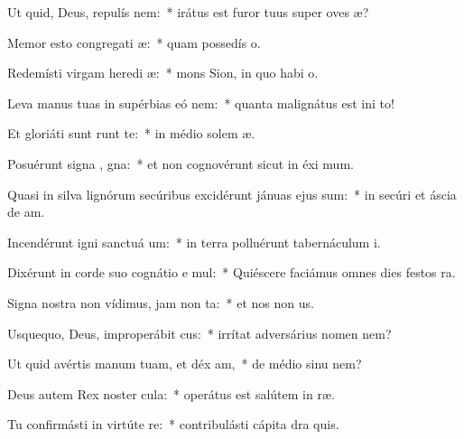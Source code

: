 \item Ut quid, Deus, repulís  nem:~* irátus est furor tuus super oves  æ?
\item Memor esto congregati æ:~* quam possedís  o.
\item Redemísti virgam heredi æ:~* mons Sion, in quo habi  o.
\item Leva manus tuas in supérbias eó  nem:~* quanta malignátus est ini  to!
\item Et gloriáti sunt  runt te:~* in médio solem æ.
\item Posuérunt signa , gna:~* et non cognovérunt sicut in éxi  mum.
\item Quasi in silva lignórum secúribus excidérunt jánuas ejus  sum:~* in secúri et áscia de am.
\item Incendérunt igni sanctuá um:~* in terra polluérunt tabernáculum  i.
\item Dixérunt in corde suo cognátio e mul:~* Quiéscere faciámus omnes dies festos   ra.
\item Signa nostra non vídimus, jam non  ta:~* et nos non  us.
\item Usquequo, Deus, improperábit cus:~* irrítat adversárius nomen   nem?
\item Ut quid avértis manum tuam, et déx am,~* de médio sinu   nem?
\item Deus autem Rex noster  cula:~* operátus est salútem in  ræ.
\item Tu confirmásti in virtúte  re:~* contribulásti cápita dra  quis.
